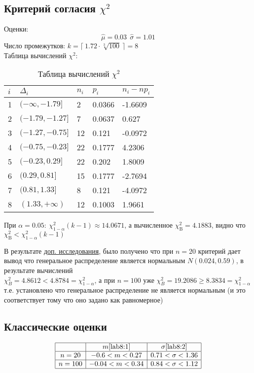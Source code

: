 \documentclass[12pt,a4paper]{article}
\begin{document}
\subsection{Критерий согласия $\chi^2$}
Оценки: 
\begin{equation}\label{lab7:1}
\widehat{\mu} = 0.03 \ \ \widehat{\sigma} = 1.01
\end{equation}
Число промежутков: $k = \lceil \ 1.72 \cdot \sqrt[3]{100} \ \rceil = 8$ \\ 

Таблица вычислений $\chi^2$:
\begin{table}[h!]
	\centering
	\begin{tabular}{|l|l|l|l|l|}
		\hline
		$i$&$\Delta_i$		&$n_i$&$p_i$	&$n_i - np_i$  \\ \hline
		1&$(-\infty, -1.79]$&2    &0.0366  	&-1.6609  	\\ \hline
		2&$(-1.79, -1.27]$	&7    &0.0637	&0.627  	\\ \hline
		3&$(-1.27, -0.75]$	&12   &0.121	&-0.0972  	\\ \hline
		4&$(-0.75, -0.23]$	&22   &0.1777	&4.2306  	\\ \hline
		5&$(-0.23, 0.29]$	&22   &0.202	&1.8009    \\ \hline
		6&$(0.29, 0.81]$	&15   &0.1777	&-2.7694	\\ \hline
		7&$(0.81, 1.33]$	&8    &0.121   &-4.0972  	\\ \hline
		8&$(1.33, +\infty)$	&12   &0.1003	&1.9661  	\\ \hline
	\end{tabular}
	\caption{Таблица вычислений $\chi^2$}
\end{table}

При $\alpha = 0.05: \ \chi^2_{1-\alpha}(k-1) \approx 14.0671$, а вычисленное $\chi^2_{\text{B}} = 4.1883$, видно что \\ $\chi^2_{\text{B}} < \chi^2_{1-\alpha}(k-1)$

В результате \hyperref[bonus]{доп. исследования}, было получено что при $n = 20$ критерий дает вывод что генеральное распределение является нормальным $N(0.024, 0.59)$, в результате вычислений \\ $\chi^2_{B} = 4.8612 < 4.8784 = \chi^2_{1-\alpha}$, а при $n = 100$ уже $\chi^2_{B} = 19.2086 \geq 8.3834 = \chi^2_{1-\alpha}$ т.е. установлено что генеральное распределение не является нормальным (и это соответствует тому что оно задано как равномерное)

\subsection{Классические оценки}
\begin{equation*}
\begin{array}{|c|c|c|}
\hline 		& m\eqref{lab8:1} 	& \sigma\eqref{lab8:2} \\
\hline n=20	& -0.6 < m < 0.27	& 0.71 < \sigma < 1.36 \\
\hline n=100& -0.04 < m < 0.34 	& 0.84 < \sigma < 1.12 \\
\hline
\end{array}
\end{equation*}
\end{document}
